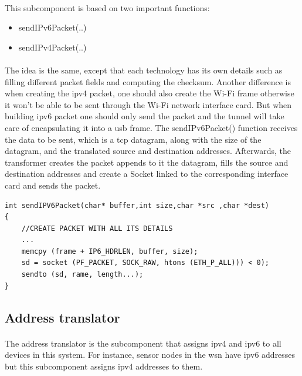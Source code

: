 \documentclass[12pt,a4paper,final]{report}
\begin{document}
\paragraph{}
This subcomponent is based on two important functions:
\begin{itemize}
\item sendIPv6Packet(..)
\item sendIPv4Packet(..)
\end{itemize}
\paragraph{}
The idea is the same, except that each technology has its own details such as filling different packet fields and computing the checksum. Another difference is when creating the \gls{ipv4} packet, one should also create the Wi-Fi frame otherwise it won't be able to be sent through the Wi-Fi network interface card. But when building \gls{ipv6} packet one should only send the packet and the tunnel will take care of encapsulating it into a \gls{usb} frame.
The sendIPv6Packet() function receives the data to be sent, which is a \gls{tcp} datagram, along with the size of the datagram, and the translated source and destination addresses. Afterwards, the transformer creates the packet appends to it the datagram, fills the source and destination addresses and create a Socket linked to the corresponding interface card and sends the packet.

\begin{singlespacing}
\begin{lstlisting}
int sendIPV6Packet(char* buffer,int size,char *src ,char *dest)
{
	//CREATE PACKET WITH ALL ITS DETAILS
	...
	memcpy (frame + IP6_HDRLEN, buffer, size);
	sd = socket (PF_PACKET, SOCK_RAW, htons (ETH_P_ALL))) < 0);
	sendto (sd, rame, length...);
}
\end{lstlisting}
\end{singlespacing}

\subsection{Address translator}
\paragraph{}
The address translator is the subcomponent that assigns \gls{ipv4} and \gls{ipv6} to all devices in this system. For instance, sensor nodes in the \gls{wsn} have \gls{ipv6} addresses but this subcomponent assigns \gls{ipv4} addresses to them.
\end{document}

